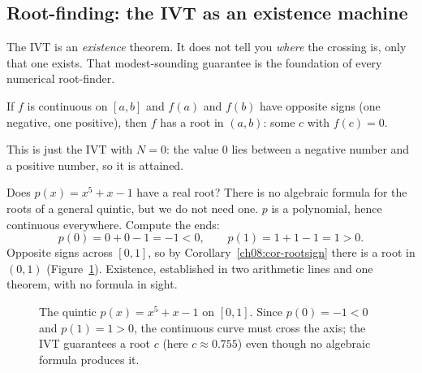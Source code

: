 \subsection{Root-finding: the IVT as an existence machine}

The IVT is an \emph{existence} theorem. It does not tell you \emph{where} the crossing is,
only that one exists. That modest-sounding guarantee is the foundation of every numerical
root-finder.

\begin{corollary}
\label{ch08:cor-rootsign}
If $f$ is continuous on $[a,b]$ and $f(a)$ and $f(b)$ have opposite signs (one negative,
one positive), then $f$ has a root in $(a,b)$: some $c$ with $f(c)=0$.
\end{corollary}

This is just the IVT with $N=0$: the value $0$ lies between a negative number and a
positive number, so it is attained.

\begin{example}
\label{ch08:ex-quintic}
Does $p(x)=x^5+x-1$ have a real root? There is no algebraic formula for the roots of a
general quintic, but we do not need one. $p$ is a polynomial, hence continuous everywhere.
Compute the ends:
\[
  p(0)=0+0-1=-1<0, \qquad p(1)=1+1-1=1>0.
\]
Opposite signs across $[0,1]$, so by Corollary~\ref{ch08:cor-rootsign} there is a root in
$(0,1)$ (Figure~\ref{ch08:fig-quintic}). Existence, established in two arithmetic lines and
one theorem, with no formula in sight.
\end{example}

\begin{figure}[H]
\centering
{}
\caption{The quintic $p(x)=x^5+x-1$ on $[0,1]$. Since $p(0)=-1<0$ and $p(1)=1>0$, the
continuous curve must cross the axis; the IVT guarantees a root $c$ (here $c\approx0.755$)
even though no algebraic formula produces it.}
\label{ch08:fig-quintic}
\end{figure}

